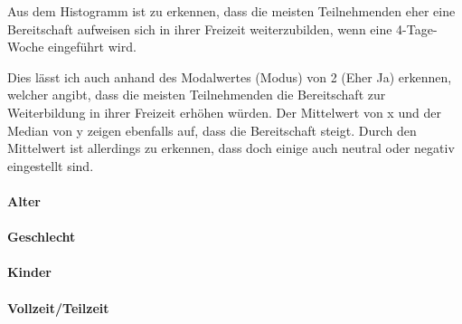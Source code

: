 Aus dem Histogramm ist zu erkennen, dass die meisten Teilnehmenden eher 
eine Bereitschaft aufweisen sich in ihrer Freizeit weiterzubilden, 
wenn eine 4-Tage-Woche eingeführt wird.

Dies lässt ich auch anhand des Modalwertes (Modus) von 2 (Eher Ja) erkennen, welcher angibt, dass die
meisten Teilnehmenden die Bereitschaft zur Weiterbildung in ihrer Freizeit erhöhen würden.
Der Mittelwert von x und der Median von y zeigen ebenfalls auf, dass die Bereitschaft steigt.
Durch den Mittelwert ist allerdings zu erkennen, dass doch einige auch neutral oder negativ 
eingestellt sind.


\paragraph*{Alter}


\paragraph*{Geschlecht}

\paragraph*{Kinder}

\paragraph*{Vollzeit/Teilzeit}






